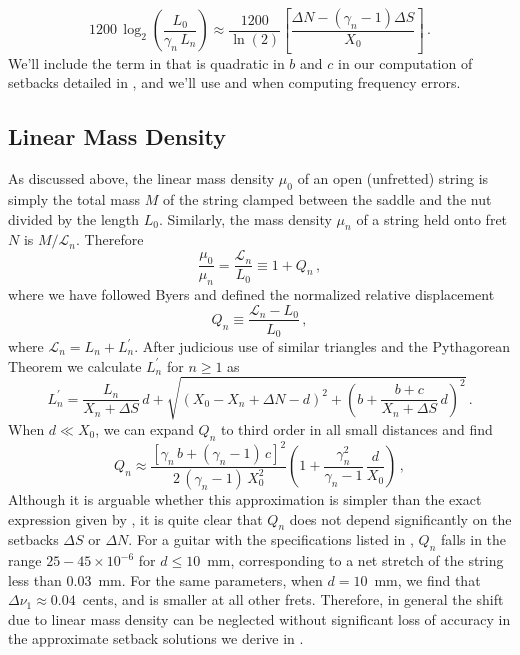 \begin{equation} \label{eqn:rle_approx}
  1200\, \log_2 \left( \frac{L_0}{\gamma_n\, L_n} \right) \approx \frac{1200}{\ln(2)} \left[ \frac{\Delta N - \left(\gamma_n - 1\right) \Delta S}{X_0}\right]\, .
\end{equation}
We'll include the term in  that is quadratic in $b$ and $c$ in our computation of setbacks detailed in , and we'll use  and  when computing frequency errors.

 \subsection{Linear Mass Density\label{sct:model_lmd}}
As discussed above, the linear mass density $\mu_0$ of an open (unfretted) string is simply the total mass $M$ of the string clamped between the saddle and the nut divided by the length $L_0$. Similarly, the mass density $\mu_n$ of a string held onto fret $N$ is $M/\mathcal{L}_n$. Therefore
 \begin{equation}
\frac{\mu_0}{\mu_n} = \frac{\mathcal{L}_n}{L_0} \equiv 1 + Q_n\, ,
 \end{equation}
where we have followed Byers and defined the normalized relative displacement~\cite{ref:byers1996cgi,ref:varieschi2010icf}
 \begin{equation} \label{eqn:q_n_def}
Q_n \equiv \frac{\mathcal{L}_n - L_0}{L_0}\, ,
 \end{equation}
where $\mathcal{L}_n = L_n + L_n^\prime$. After judicious use of similar triangles and the Pythagorean Theorem we calculate $L^\prime_n$ for $n \ge 1$ as
\begin{equation} \label{eqn:l_p_def}
  L^\prime_n = \frac{L_n}{X_n + \Delta S}\, d + \sqrt{\left(X_0 - X_n + \Delta N - d\right)^2 + \left(b + \frac{b + c}{X_n + \Delta S}\, d\right)^2}\, .
\end{equation}
When $d \ll X_0$, we can expand $Q_n$ to third order in all small distances and find
\begin{equation} \label{eqn:q_n_approx}
  Q_n \approx \frac{\left[ \gamma_n\, b + (\gamma_n - 1)\, c \right]^2}{2\, (\gamma_n - 1)\, X_0^2} \left( 1 + \frac{\gamma_n^2}{\gamma_n - 1}\, \frac{d}{X_0} \right)\, ,
\end{equation}
Although it is arguable whether this approximation is simpler than the exact expression given by , it is quite clear that $Q_n$ does not depend significantly on the setbacks $\Delta S$ or $\Delta N$. For a guitar with the specifications listed in , $Q_n$ falls in the range $25 - 45 \times 10^{-6}$ for $d \le 10$~mm, corresponding to a net stretch of the string less than $0.03$~mm. For the same parameters, when $d = 10$~mm, we find that $\Delta \nu_{1} \approx 0.04$~cents, and is smaller at all other frets. Therefore, in general the shift due to linear mass density can be neglected without significant loss of accuracy in the approximate setback solutions we derive in .

